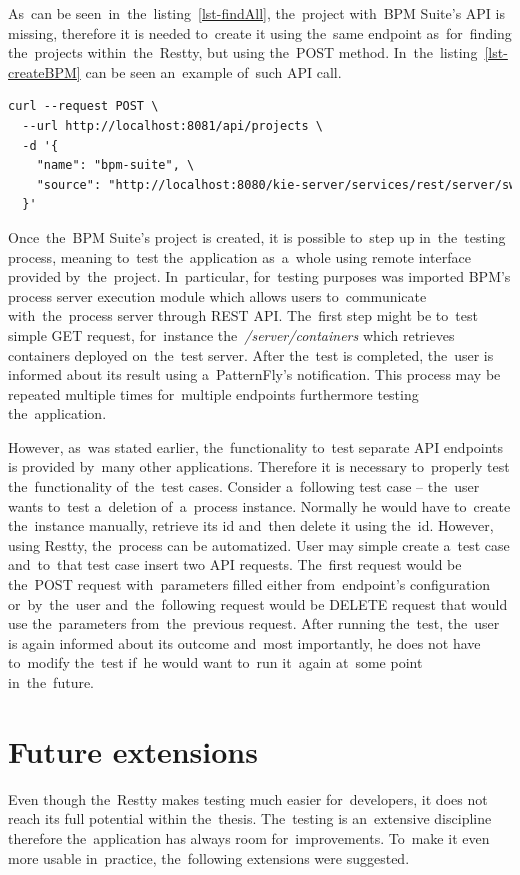 As~can be seen~in~the~listing~\ref{lst-findAll}, the~project with~BPM Suite's API is missing, therefore it is needed to~create it using
the~same endpoint as~for~finding the~projects within~the~Restty, but using the~POST method. In~the~listing~\ref{lst-createBPM}
can be seen an~example of~such API call.

\vspace{1mm}
\begin{lstlisting}[caption=Testing the~creating of~an~project within~the~Restty.,
label=lst-createBPM, style=dp-default, language=XML]
curl --request POST \
  --url http://localhost:8081/api/projects \
  -d '{
  	"name": "bpm-suite", \ 
  	"source": "http://localhost:8080/kie-server/services/rest/server/swagger.json" \
  }'
\end{lstlisting}

Once~the~BPM Suite's project is created, it is possible to~step up in~the~testing process, meaning to~test the~application as~a~whole using
remote interface provided by~the~project. In~particular, for~testing purposes was imported BPM's process server execution module which allows
users to~communicate with~the~process server through REST API. The~first step might be to~test simple GET request, for~instance
the~\textit{/server/containers} which retrieves containers deployed on~the~test server. After the~test is completed, the~user is informed about
its result using a~PatternFly's notification. This process may be repeated multiple times for~multiple endpoints furthermore testing the~application.

However, as~was stated earlier, the~functionality to~test separate API endpoints is provided by~many other applications. Therefore it is necessary 
to~properly test the~functionality of~the~test cases. Consider a~following test case -- the~user wants to~test a~deletion of~a~process instance. Normally
he would have to~create the~instance manually, retrieve its id and~then delete it using the~id. However, using Restty, the~process can be automatized. User may simple
create a~test case and~to~that test case insert two API requests. The~first request would be the~POST request with~parameters filled 
either from~endpoint's configuration or~by~the~user and~the~following request would be DELETE request that would use the~parameters from~the~previous request.
After running the~test, the~user is again informed about its outcome and~most importantly, he does not have to~modify the~test if~he would want to~run it~again
at~some point in~the~future.

\section{Future extensions}
\label{Improvements}
Even though the~Restty makes testing much easier for~developers, it does not reach its full potential within the~thesis.
The~testing is an~extensive discipline therefore the~application has always room for~improvements. To~make it even more usable 
in~practice, the~following extensions were suggested.

